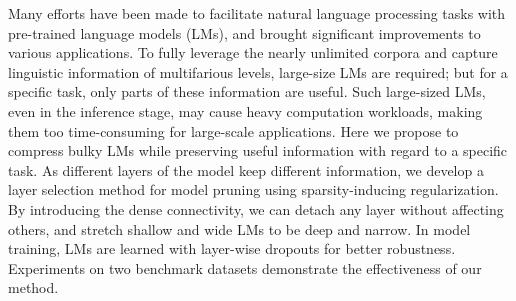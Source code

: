 Many efforts have been made to facilitate natural language processing tasks with pre-trained language models (LMs), and brought significant improvements to various applications. To fully leverage the nearly unlimited corpora and capture linguistic information of multifarious levels, large-size LMs are required; but for a specific task, only parts of these information are useful. Such large-sized LMs, even in the inference stage, may cause heavy computation workloads, making them too time-consuming for large-scale applications. Here we propose to compress bulky LMs while preserving useful information with regard to a specific task. As different layers of the model keep different information, we develop a layer selection method for model pruning using sparsity-inducing regularization. By introducing the dense connectivity, we can detach any layer without affecting others, and stretch shallow and wide LMs to be deep and narrow. In model training, LMs are learned with layer-wise dropouts for better robustness. Experiments on two benchmark datasets demonstrate the effectiveness of our method.

